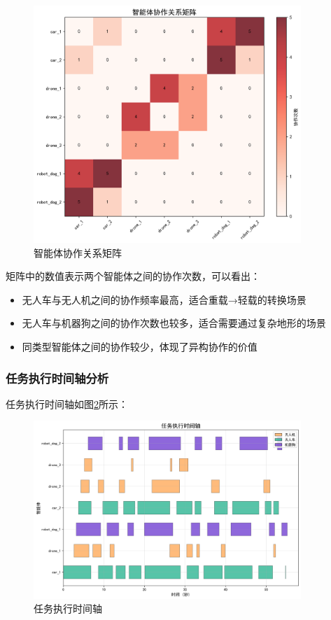 \documentclass[12pt,a4paper]{article}
\begin{document}
\begin{figure}[h]
    \centering
    \includegraphics[width=0.9\textwidth]{analysis_results/collaboration_matrix_20250617_081456.png}
    \caption{智能体协作关系矩阵}
    \label{fig:collaboration-matrix}
\end{figure}

矩阵中的数值表示两个智能体之间的协作次数，可以看出：

\begin{itemize}
    \item 无人车与无人机之间的协作频率最高，适合重载→轻载的转换场景
    \item 无人车与机器狗之间的协作次数也较多，适合需要通过复杂地形的场景
    \item 同类型智能体之间的协作较少，体现了异构协作的价值
\end{itemize}

\subsubsection{任务执行时间轴分析}

任务执行时间轴如图\ref{fig:task-timeline}所示：

\begin{figure}[h]
    \centering
    \includegraphics[width=0.9\textwidth]{analysis_results/task_timeline_20250617_081456.png}
    \caption{任务执行时间轴}
    \label{fig:task-timeline}
\end{figure}
\end{document}
